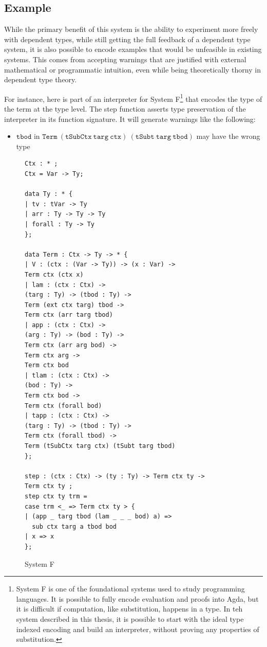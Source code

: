 \subsection{Example}

While the primary benefit of this system is the ability to experiment more freely with dependent types, while still getting the full feedback of a dependent type system, it is also possible to encode examples that would be unfeasible in existing systems.
This comes from accepting warnings that are justified with external mathematical or programmatic intuition, even while being theoretically thorny in dependent type theory.

For instance, here is part of an interpreter for System F\footnote{
 System F is one of the foundational systems used to study programming languages.
 It is possible to fully encode evaluation and proofs into Agda, but it is difficult if computation, like substitution, happens in a type.
 In teh system described in this thesis, it is possible to start with the ideal type indexed encoding and build an interpreter, without proving any properties of substitution.
} that encodes the type of the term at the type level.
The step function asserts type preservation of the interpreter in its function signature.
It will generate warnings like the following:


\begin{itemize}
\item $\mathtt{tbod}$ in $\mathtt{Term\ (tSubCtx\ targ\ ctx)\ (tSubt\ targ\ \underline{tbod})}$
may have the wrong type
\end{itemize}

\begin{figure}
\begin{lstlisting}[basicstyle={\ttfamily\small}]
Ctx : * ;
Ctx = Var -> Ty;

data Ty : * {
| tv : tVar -> Ty
| arr : Ty -> Ty -> Ty
| forall : Ty -> Ty
};

data Term : Ctx -> Ty -> * {
| V : (ctx : (Var -> Ty)) -> (x : Var) ->
Term ctx (ctx x)
| lam : (ctx : Ctx) ->
(targ : Ty) -> (tbod : Ty) ->
Term (ext ctx targ) tbod ->
Term ctx (arr targ tbod)
| app : (ctx : Ctx) ->
(arg : Ty) -> (bod : Ty) ->
Term ctx (arr arg bod) ->
Term ctx arg ->
Term ctx bod
| tlam : (ctx : Ctx) ->
(bod : Ty) ->
Term ctx bod ->
Term ctx (forall bod)
| tapp : (ctx : Ctx) ->
(targ : Ty) -> (tbod : Ty) ->
Term ctx (forall tbod) ->
Term (tSubCtx targ ctx) (tSubt targ tbod)
};

step : (ctx : Ctx) -> (ty : Ty) -> Term ctx ty ->
Term ctx ty ;
step ctx ty trm =
case trm <_ => Term ctx ty > {
| (app _ targ tbod (lam _ _ _ bod) a) =>
  sub ctx targ a tbod bod
| x => x
};
\end{lstlisting}

\caption{System F}
\label{fig:ex-sysf}
\end{figure}

